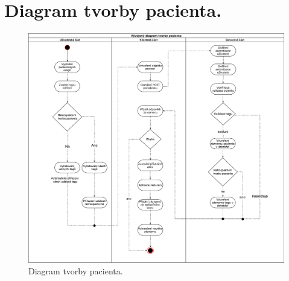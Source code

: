 \documentclass[czech,master,public,dept450,male,oneside, hidelinks]{diploma}
\begin{document}
	\section{Diagram tvorby pacienta.}
	\begin{figure}
		\includegraphics[width=21cm]{Appendix/src/createPatient.pdf}
		\caption{Diagram tvorby pacienta.}
	\end{figure}	
	
\end{document}
